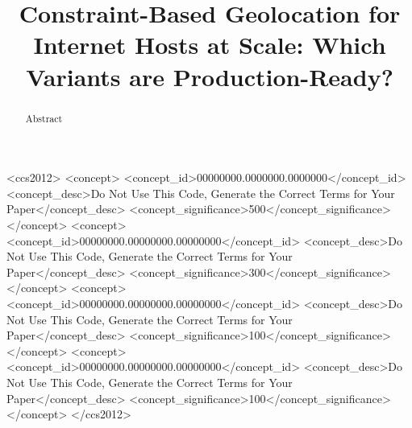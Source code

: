 \documentclass[acmsmall]{acmart}
\begin{document}
\title{Constraint-Based Geolocation for Internet Hosts at Scale: Which Variants are Production-Ready?}


\renewcommand{\shortauthors}{Wang et al.}

\begin{abstract}
Abstract
\end{abstract}

\begin{CCSXML}
<ccs2012>
 <concept>
  <concept_id>00000000.0000000.0000000</concept_id>
  <concept_desc>Do Not Use This Code, Generate the Correct Terms for Your Paper</concept_desc>
  <concept_significance>500</concept_significance>
 </concept>
 <concept>
  <concept_id>00000000.00000000.00000000</concept_id>
  <concept_desc>Do Not Use This Code, Generate the Correct Terms for Your Paper</concept_desc>
  <concept_significance>300</concept_significance>
 </concept>
 <concept>
  <concept_id>00000000.00000000.00000000</concept_id>
  <concept_desc>Do Not Use This Code, Generate the Correct Terms for Your Paper</concept_desc>
  <concept_significance>100</concept_significance>
 </concept>
 <concept>
  <concept_id>00000000.00000000.00000000</concept_id>
  <concept_desc>Do Not Use This Code, Generate the Correct Terms for Your Paper</concept_desc>
  <concept_significance>100</concept_significance>
 </concept>
</ccs2012>
\end{CCSXML}

\end{document}
